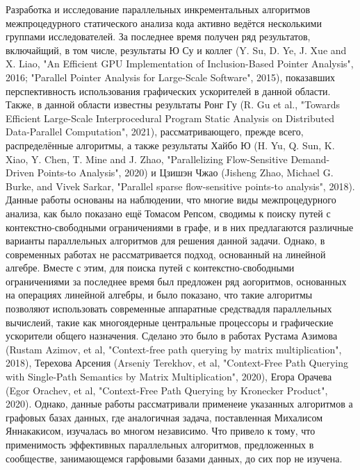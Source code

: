 \documentclass[12pt]{article}  %
\theoremstyle{remark}
\begin{document}
Разработка и исследование параллельных инкрементальных алгоритмов межпроцедурного статического анализа кода активно ведётся несколькими группами исследователей. За последнее время получен ряд результатов, включайщий, в том числе, результаты Ю Су и коллег (Y. Su, D. Ye, J. Xue and X. Liao, "An Efficient GPU Implementation of Inclusion-Based Pointer Analysis", 2016; "Parallel Pointer Analysis for Large-Scale Software", 2015), показавших перспективность использования графических ускорителей в данной области. Также, в данной области известны результаты Ронг Гу (R. Gu et al., "Towards Efficient Large-Scale Interprocedural Program Static Analysis on Distributed Data-Parallel Computation", 2021), рассматривающего, прежде всего, распределённые алгоритмы, а также результаты Хайбо Ю (H. Yu, Q. Sun, K. Xiao, Y. Chen, T. Mine and J. Zhao, "Parallelizing Flow-Sensitive Demand-Driven Points-to Analysis", 2020) и  Цзишэн Чжао (Jisheng Zhao, Michael G. Burke, and Vivek Sarkar, "Parallel sparse flow-sensitive points-to analysis", 2018). Данные работы основаны на наблюдении, что многие виды межпроцедурного анализа, как было показано ещё Томасом Репсом, сводимы к поиску путей с контекстно-свободными ограничениями в графе, и в них предлагаются различные варианты параллельных алгоритмов для решения данной задачи. Однако, в современных работах не рассматривается подход, основанный на линейной алгебре. Вместе с этим, для поиска путей с контекстно-свободными ограничениями за последнее время был предложен ряд аогоритмов, основанных на операциях линейной алгебры, и было показано, что такие алгоритмы позволяют использовать современные аппаратные средствадля параллельных вычислеий, такие как многоядерные центральные процессоры и графические ускорители общего назначения. Сделано это было в работах Рустама Азимова (Rustam Azimov, et al, "Context-free path querying by matrix multiplication", 2018), Терехова Арсения (Arseniy Terekhov, et al, "Context-Free Path Querying with Single-Path Semantics by Matrix Multiplication", 2020), Егора Орачева (Egor Orachev, et al, "Context-Free Path Querying by Kronecker Product", 2020). Однако, данные работы рассматривали применеие указанных алгоритмов а графовых базах данных, где аналогичная задача, поставленная Михалисом Яннакакисом, изучалась во многом независимо. Что привело к тому, что применимость эффективных параллельных алгоритмов, предложенных в сообществе, занимающемся гарфовыми базами данных, до сих пор не изучена.
\end{document}
